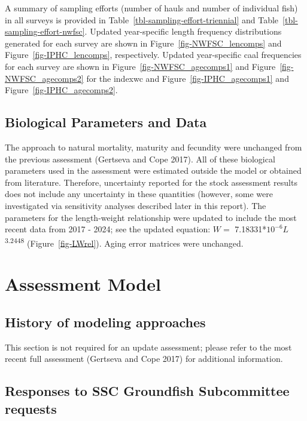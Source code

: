 \documentclass[
]{scrartcl}
\begin{document}
A summary of sampling efforts (number of hauls and number of individual
fish) in all surveys is provided in
Table~\ref{tbl-sampling-effort-triennial} and
Table~\ref{tbl-sampling-effort-nwfsc}. Updated year-specific length
frequency distributions generated for each survey are shown in
Figure~\ref{fig-NWFSC_lencomps} and Figure~\ref{fig-IPHC_lencomps},
respectively. Updated year-specific \gls{caal} frequencies for each
survey are shown in Figure~\ref{fig-NWFSC_agecomps1} and
Figure~\ref{fig-NWFSC_agecomps2} for the \gls{indexwc} and
Figure~\ref{fig-IPHC_agecomps1} and Figure~\ref{fig-IPHC_agecomps2}.

\subsection{Biological Parameters and
Data}\label{biological-parameters-and-data}

The approach to natural mortality, maturity and fecundity were unchanged
from the previous assessment (Gertseva and Cope 2017). All of these
biological parameters used in the assessment were estimated outside the
model or obtained from literature. Therefore, uncertainty reported for
the stock assessment results does not include any uncertainty in these
quantities (however, some were investigated via sensitivity analyses
described later in this report). The parameters for the length-weight
relationship were updated to include the most recent data from 2017 -
2024; see the updated equation: \(W =\)
7.18331*\(10^{-6}L\)\textsuperscript{3.2448} (Figure~\ref{fig-LWrel}).
Aging error matrices were unchanged.

\newpage{}

\section{Assessment Model}\label{assessment-model}

\subsection{History of modeling
approaches}\label{history-of-modeling-approaches}

This section is not required for an update assessment; please refer to
the most recent full assessment (Gertseva and Cope 2017) for additional
information.

\subsection{Responses to SSC Groundfish Subcommittee
requests}\label{responses-to-ssc-groundfish-subcommittee-requests}
\end{document}
